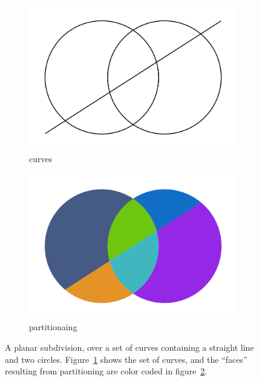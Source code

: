 \begin{figure}%
  \centering
  \begin{subfigure}{.4\textwidth}
    \includegraphics[width=\textwidth]{figures/intro_curves2.png}
    \caption{curves} \label{subfig:intro_curves2}
  \end{subfigure}%
  \quad \quad \quad%
  \begin{subfigure}{.4\textwidth}
    \includegraphics[width=\textwidth]{figures/intro_partitioning2.png}
    \caption{partitionaing} \label{subfig:intro_partitioning2}
  \end{subfigure}%
  \caption[xxx]
          {A planar subdivision, over a set of curves containing a straight line and two circles.
          Figure~\ref{subfig:intro_curves2} shows the set of curves, and the ``faces'' resulting from partitioning are color coded in figure~\ref{subfig:intro_partitioning2}.}
  \label{fig:intro_curvesPartitioning2}
\end{figure}

